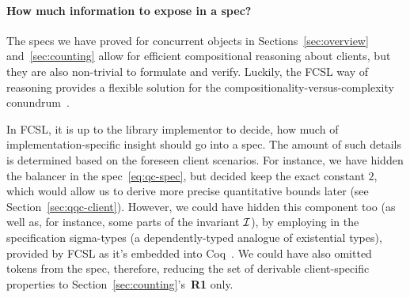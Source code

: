 

\paragraph{How much information to expose in a spec?}
\label{sec:how-much-information}

The specs we have proved for concurrent objects in
Sections~\ref{sec:overview} and~\ref{sec:counting} allow for efficient
compositional reasoning about clients, but they are also non-trivial
to formulate and verify. Luckily, the FCSL way of reasoning provides a
flexible solution for the compositionality-versus-complexity
conundrum~\cite[\S 7]{Lamport:COMPOS97}.

In FCSL, it is up to the library implementor to decide, how much of
implementation-specific insight should go into a spec. The amount of
such details is determined based on the foreseen client scenarios. For
instance, we have hidden the balancer in the spec~\eqref{eq:qc-spec},
but decided keep the exact constant $2$, which would allow us to
derive more precise quantitative bounds later (see
Section~\ref{sec:qqc-client}). However, we could have hidden this
component too (as well as, for instance, some parts of the invariant
$\mathcal{I}$), by employing in the specification sigma-types (a
dependently-typed analogue of existential types), provided by FCSL as
it's embedded into Coq~\cite{Coq-manual}. We could have also omitted
tokens from the spec, therefore, reducing the set of derivable
client-specific properties to Section~\ref{sec:counting}'s~\textbf{R1}
only.


